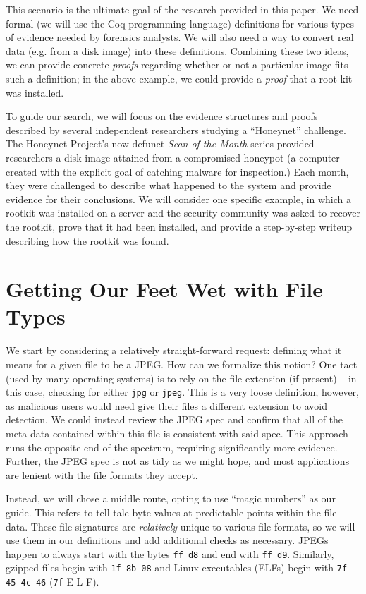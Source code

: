\documentclass[nocopyrightspace]{sigplanconf}
\begin{document}
This scenario is the ultimate goal of the research provided in this paper. We
need formal (we will use the Coq programming language) definitions for various
types of evidence needed by forensics analysts. We will also need a way to
convert real data (e.g. from a disk image) into these definitions. Combining
these two ideas, we can provide concrete {\em proofs} regarding whether or not
a particular image fits such a definition; in the above example, we could
provide a {\em proof} that a root-kit was installed.

To guide our search, we will focus on the evidence structures and proofs
described by several independent researchers studying a ``Honeynet''
challenge. The Honeynet Project\cite{honeynet}'s now-defunct {\it Scan of the
Month} series provided researchers a disk image attained from a compromised
honeypot (a computer created with the explicit goal of catching malware for
inspection.) Each month, they were challenged to describe what happened to the
system and provide evidence for their conclusions. We will consider one
specific example\cite{honeynet-15}, in which a rootkit was installed on a
server and the security community was asked to recover the rootkit, prove that
it had been installed, and provide a step-by-step writeup describing how the
rootkit was found.

\section{Getting Our Feet Wet with File Types}

We start by considering a relatively straight-forward request: defining what
it means for a given file to be a JPEG. How can we formalize this notion? One
tact (used by many operating systems) is to rely on the file extension (if
present) -- in this case, checking for either {\tt jpg} or {\tt jpeg}. This is
a very loose definition, however, as malicious users would need give their
files a different extension to avoid detection. We could instead review the
JPEG spec and confirm that all of the meta data contained within this file is
consistent with said spec. This approach runs the opposite end of the
spectrum, requiring significantly more evidence. Further, the JPEG spec is not
as tidy as we might hope, and most applications are lenient with the file
formats they accept.

Instead, we will chose a middle route, opting to use ``magic numbers'' as our
guide. This refers to tell-tale byte values at predictable points within the
file data. These file signatures are {\it relatively} unique to various file
formats, so we will use them in our definitions and add additional checks as
necessary. JPEGs happen to always start with the bytes {\tt ff d8} and end
with {\tt ff d9}. Similarly, gzipped files begin with {\tt 1f 8b 08} and Linux
executables (ELFs) begin with {\tt 7f 45 4c 46} ({\tt 7f} E L F).
\end{document}
